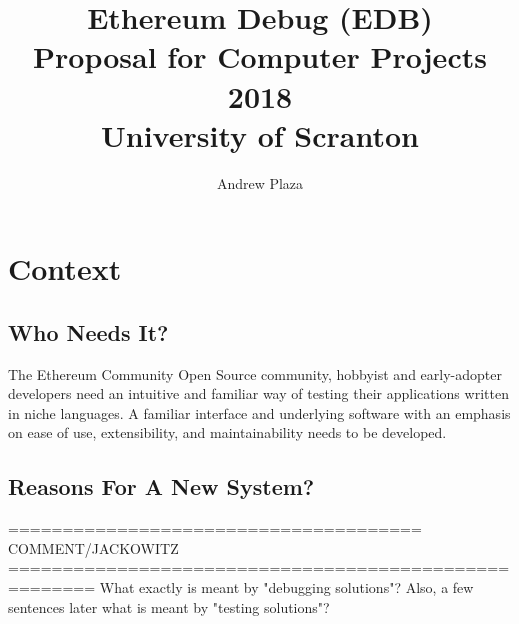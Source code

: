 \documentclass[]{article}
\title{%
	Ethereum Debug (EDB) \\
	\large	Proposal for Computer Projects 2018 \\
	\large University of Scranton}
\author{Andrew Plaza}
\begin{document}
\maketitle
\newpage
\tableofcontents
\newpage

\section{Context}
\subsection{Who Needs It?}

\iffalse
====================================== COMMENT ==============================================================
I would give more context to the importance of Ethereum. What is Ethereum? What is blockchain? you do not need to write much in terms of this. But you should include a few sentences. The general structure of your context 1.1 can be: 1.) general idea of blockchain. 2.) what is ethereum in terms of blockchain? 3.) What are the problems facing Ethereum. 4.) These problems result in needs for solutions. These needs thus constitute reasons for a new system. 5.) who would benefit from this new system?

This would require a switch of 1.1 and 1.2

(Jackowitz)
Since it is not likely that most of your readers will be familiar with Ethereum (hasn't that been your experience as you have spoken with folks in the department) I think it vital that you first provide background on blockchain, blockchain programming and specifically Ethereum.
====================================== COMMENT ==============================================================
\fi

The Ethereum Community Open Source community, hobbyist and early-adopter developers need an intuitive and familiar way of testing their applications written in niche languages. A familiar interface and underlying software with an emphasis on ease of use, extensibility, and maintainability needs to be developed.

\subsection{Reasons For A New System?}
\iffalse
====================================== COMMENT/JACKOWITZ ======================================================
What exactly is meant by "debugging solutions"? Also, a few sentences later what is meant by "testing solutions"?
\end{document}
